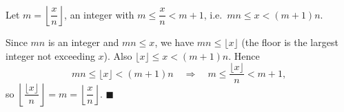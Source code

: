 Let $m=\left\lfloor\dfrac {x}{n}\right\rfloor$, an integer with $m\le\dfrac {x}{n}<m+1$, i.e.\ $mn\le x<(m+1)n$.

Since $mn$ is an integer and $mn\le x$, we have $mn\le\lfloor x\rfloor$ (the floor is the largest integer not exceeding $x$). Also $\lfloor x\rfloor\le x<(m+1)n$. Hence
\[
mn\le\lfloor x\rfloor<(m+1)n\quad\Longrightarrow\quad m\le\dfrac{\lfloor x\rfloor}{n}<m+1,
\]
so $\left\lfloor\dfrac{\lfloor x\rfloor}{n}\right\rfloor=m=\left\lfloor\dfrac {x}{n}\right\rfloor$. $\blacksquare$

